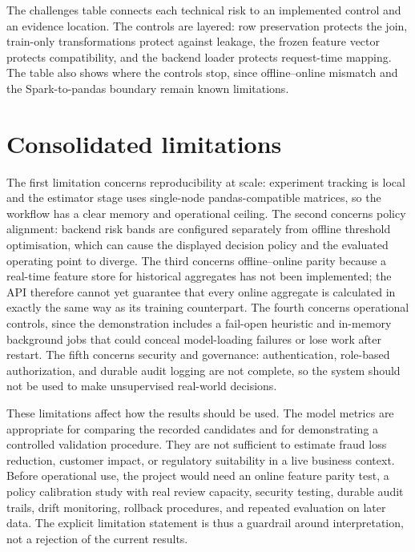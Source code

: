 The challenges table connects each technical risk to an implemented control and
an evidence location. The controls are layered: row preservation protects the
join, train-only transformations protect against leakage, the frozen feature
vector protects compatibility, and the backend loader protects request-time
mapping. The table also shows where the controls stop, since offline--online
mismatch and the Spark-to-pandas boundary remain known limitations.

\section{Consolidated limitations}

The first limitation concerns reproducibility at scale: experiment tracking is local and the estimator stage uses single-node pandas-compatible matrices, so the workflow has a clear memory and operational ceiling. The second concerns policy alignment: backend risk bands are configured separately from offline threshold optimisation, which can cause the displayed decision policy and the evaluated operating point to diverge. The third concerns offline--online parity because a real-time feature store for historical aggregates has not been implemented; the API therefore cannot yet guarantee that every online aggregate is calculated in exactly the same way as its training counterpart. The fourth concerns operational controls, since the demonstration includes a fail-open heuristic and in-memory background jobs that could conceal model-loading failures or lose work after restart. The fifth concerns security and governance: authentication, role-based authorization, and durable audit logging are not complete, so the system should not be used to make unsupervised real-world decisions.

These limitations affect how the results should be used. The model metrics are
appropriate for comparing the recorded candidates and for demonstrating a
controlled validation procedure. They are not sufficient to estimate fraud
loss reduction, customer impact, or regulatory suitability in a live business
context. Before operational use, the project would need an online feature
parity test, a policy calibration study with real review capacity, security
testing, durable audit trails, drift monitoring, rollback procedures, and
repeated evaluation on later data. The explicit limitation statement is thus a
guardrail around interpretation, not a rejection of the current results.
